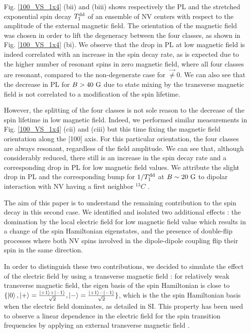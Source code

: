 \documentclass[preprintnumbers,amsmath,amssymb,superscriptaddress,twocolumn,showpacs]{revtex4-2}
\begin{document}
Fig. \ref{100_VS_1x4} (bii) and (biii) shows respectively the PL and the stretched exponential spin decay $T_1^{\rm dd}$ of an ensemble of NV centers with respect to the amplitude of the external magnetic field. The orientation of the magnetic field was chosen in order to lift the degeneracy between the four classes, as shown in Fig. \ref{100_VS_1x4} (bi). We observe that the drop in PL at low magnetic field is indeed correlated with an increase in the spin decay rate, as is expected due to the higher number of resonant spins in zero magnetic field, where all four classes are resonant, compared to the non-degenerate case for $\vec \neq 0$. We can also see that the decrease in PL for $B>40\ \rm G$ due to state mixing by the transverse magnetic field is not correlated to a modification of the spin lifetime.

However, the splitting of the four classes is not sole reason to the decrease of the spin lifetime in low magnetic field. Indeed, we performed similar measurements in Fig. \ref{100_VS_1x4} (cii) and (ciii) but this time fixing the magnetic field orientation along the [100] axis. For this particular orientation, the four classes are always resonant, regardless of the field amplitude. We can see that, although considerably reduced, there still is an increase in the spin decay rate and a corresponding drop in PL for low magnetic field values. We attribute the slight drop in PL and the corresponding bump for $1/T_1^{\rm dd}$ at $B \sim 20\ \rm G$ to dipolar interaction with NV having a first neighbor $^{13}C$ \cite{pellet2021optical}.

The aim of this paper is to understand the remaining contribution to the spin decay in this second case. We identified and isolated two additional effects : the domination by the local electric field for low magnetic field value which results in a change of the spin Hamiltonian eigenstates, and the presence of double-flip processes where both NV spins involved in the dipole-dipole coupling flip their spin in the same direction.

In order to distinguish these two contributions, we decided to simulate the effect of the electric field by using a transverse magnetic field : for relatively weak transverse magnetic field, the eigen basis of the spin Hamiltonian is close to $\{ \ket{0},\ket{+}=\frac{\ket{+1}+\ket{-1}}{\sqrt{2}},\ket{-}=\frac{\ket{+1}-\ket{-1}}{\sqrt{2}} \} $, which is the the spin Hamiltonian basis when the electric field dominates, as detailed in SI. This property has been used to observe a linear dependence in the electric field for the spin transition frequencies by applying an external transverse magnetic field \cite{dolde2011electric,qiu2022nanoscale}.
\end{document}

